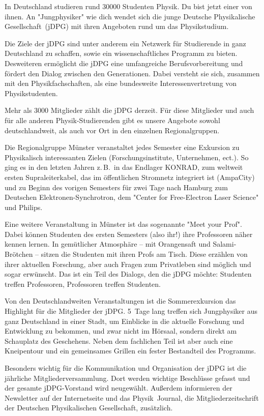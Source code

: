 \begin{multicols}{2}
In Deutschland studieren rund \num{30000} Studenten Physik.
Du bist jetzt einer von ihnen.
An "Jungphysiker" wie dich wendet sich die junge Deutsche Physikalische Gesellschaft~(jDPG) mit ihren Angeboten rund um das Physikstudium.

Die Ziele der jDPG sind unter anderem ein Netzwerk für Studierende in ganz Deutschland zu schaffen, sowie ein wissenschaftliches Programm zu bieten.
Desweiteren ermöglicht die jDPG eine umfangreiche Berufsvorbereitung und fördert den Dialog zwischen den Generationen.
Dabei versteht sie sich, zusammen mit den Physikfachschaften, als eine bundesweite Interessenvertretung von Physikstudenten.

Mehr als \num{3000} Mitglieder zählt die jDPG derzeit.
Für diese Mitglieder und auch für alle anderen Physik-Studierenden gibt es unsere Angebote sowohl deutschlandweit, als auch vor Ort in den einzelnen Regionalgruppen.

Die Regionalgruppe Münster veranstaltet jedes Semester eine Exkursion zu Physikalisch interessanten Zielen (Forschungsinstitute, Unternehmen, ect.).
So ging es in den letzten Jahren z.\,B.\ in das Endlager KONRAD, zum weltweit ersten Supraleiterkabel, das im öffentlichen Stromnetz integriert ist (AmpaCity) und zu Beginn des vorigen Semesters für zwei Tage nach Hamburg zum Deutschen Elektronen-Synchrotron, dem "Center for Free-Electron Laser Science" und Philips.

Eine weitere Veranstaltung in Münster ist das sogenannte "Meet your Prof".
Dabei können Studenten des ersten Semesters (also ihr!) ihre Professoren näher kennen lernen.
In gemütlicher Atmosphäre -- mit Orangensaft und Salami-Brötchen -- sitzen die Studenten mit ihren Profs am Tisch.
Diese erzählen von ihrer aktuellen Forschung, aber auch Fragen zum Privatleben sind möglich und sogar erwünscht.
Das ist ein Teil des Dialogs, den die jDPG möchte: Studenten treffen Professoren, Professoren treffen Studenten.

Von den Deutschlandweiten Veranstaltungen ist die Sommerexkursion das Highlight für die Mitglieder der jDPG.
5~Tage lang treffen sich Jungphysiker aus ganz Deutschland in einer Stadt, um Einblicke in die aktuelle Forschung und Entwicklung zu bekommen, und zwar nicht im Hörsaal, sondern direkt am Schauplatz des Geschehens.
Neben dem fachlichen Teil ist aber auch eine Kneipentour und ein gemeinsames Grillen ein fester Bestandteil des Programms.

Besonders wichtig für die Kommunikation und Organisation der jDPG ist die jährliche Mitgliederversammlung.
Dort werden wichtige Beschlüsse gefasst und der gesamte jDPG-Vorstand wird neugewählt.
Außerdem informieren der Newsletter auf der Internetseite und das Physik~Journal, die Mitgliederzeitschrift der Deutschen Physikalischen Gesellschaft, zusätzlich.


\end{multicols}
